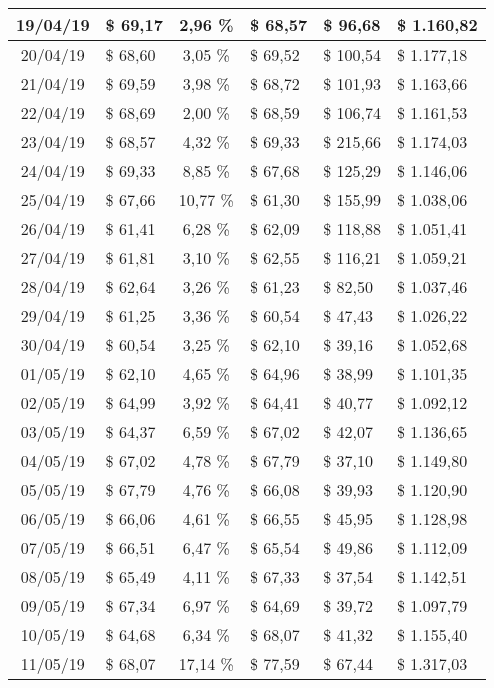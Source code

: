 \begin{center}
\begin{small}
\begin{longtable}{|c|l|c|l|l|l|}
19/04/19 & \$ 69,17 & 2,96 \% & \$ 68,57 & \$ 96,68 & \$ 1.160,82 \\ \hline
20/04/19 & \$ 68,60 & 3,05 \% & \$ 69,52 & \$ 100,54 & \$ 1.177,18 \\ \hline
21/04/19 & \$ 69,59 & 3,98 \% & \$ 68,72 & \$ 101,93 & \$ 1.163,66 \\ \hline
22/04/19 & \$ 68,69 & 2,00 \% & \$ 68,59 & \$ 106,74 & \$ 1.161,53 \\ \hline
23/04/19 & \$ 68,57 & 4,32 \% & \$ 69,33 & \$ 215,66 & \$ 1.174,03 \\ \hline
24/04/19 & \$ 69,33 & 8,85 \% & \$ 67,68 & \$ 125,29 & \$ 1.146,06 \\ \hline
25/04/19 & \$ 67,66 & 10,77 \% & \$ 61,30 & \$ 155,99 & \$ 1.038,06 \\ \hline
26/04/19 & \$ 61,41 & 6,28 \% & \$ 62,09 & \$ 118,88 & \$ 1.051,41 \\ \hline
27/04/19 & \$ 61,81 & 3,10 \% & \$ 62,55 & \$ 116,21 & \$ 1.059,21 \\ \hline
28/04/19 & \$ 62,64 & 3,26 \% & \$ 61,23 & \$ 82,50 & \$ 1.037,46 \\ \hline
29/04/19 & \$ 61,25 & 3,36 \% & \$ 60,54 & \$ 47,43 & \$ 1.026,22 \\ \hline
30/04/19 & \$ 60,54 & 3,25 \% & \$ 62,10 & \$ 39,16 & \$ 1.052,68 \\ \hline
01/05/19 & \$ 62,10 & 4,65 \% & \$ 64,96 & \$ 38,99 & \$ 1.101,35 \\ \hline
02/05/19 & \$ 64,99 & 3,92 \% & \$ 64,41 & \$ 40,77 & \$ 1.092,12 \\ \hline
03/05/19 & \$ 64,37 & 6,59 \% & \$ 67,02 & \$ 42,07 & \$ 1.136,65 \\ \hline
04/05/19 & \$ 67,02 & 4,78 \% & \$ 67,79 & \$ 37,10 & \$ 1.149,80 \\ \hline
05/05/19 & \$ 67,79 & 4,76 \% & \$ 66,08 & \$ 39,93 & \$ 1.120,90 \\ \hline
06/05/19 & \$ 66,06 & 4,61 \% & \$ 66,55 & \$ 45,95 & \$ 1.128,98 \\ \hline
07/05/19 & \$ 66,51 & 6,47 \% & \$ 65,54 & \$ 49,86 & \$ 1.112,09 \\ \hline
08/05/19 & \$ 65,49 & 4,11 \% & \$ 67,33 & \$ 37,54 & \$ 1.142,51 \\ \hline
09/05/19 & \$ 67,34 & 6,97 \% & \$ 64,69 & \$ 39,72 & \$ 1.097,79 \\ \hline
10/05/19 & \$ 64,68 & 6,34 \% & \$ 68,07 & \$ 41,32 & \$ 1.155,40 \\ \hline
11/05/19 & \$ 68,07 & 17,14 \% & \$ 77,59 & \$ 67,44 & \$ 1.317,03 \\ \hline

\end{longtable}
\end{small}
\end{center}

